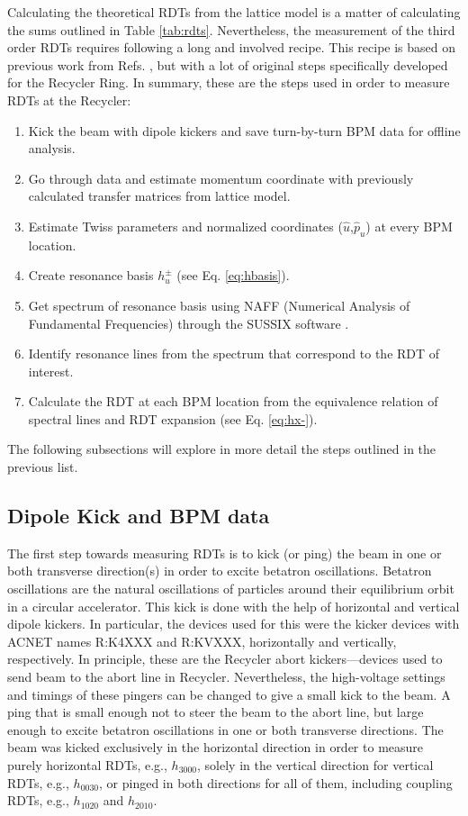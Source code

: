 Calculating the theoretical RDTs from the lattice model is a matter of calculating the sums outlined in Table \ref{tab:rdts}. Nevertheless, the measurement of the third order RDTs requires following a long and involved recipe. This recipe is based on previous work from Refs. \cite{cernthesis2,bartolini}, but with a lot of original steps specifically developed for the Recycler Ring. In summary, these are the steps used in order to measure RDTs at the Recycler:
\begin{enumerate}
    \item Kick the beam with dipole kickers and save turn-by-turn BPM data for offline analysis.
    \item Go through data and estimate momentum coordinate with previously calculated transfer matrices from lattice model.
    \item Estimate Twiss parameters and normalized coordinates ($\hat{u}$,$\hat{p}_u$) at every BPM location.
    \item Create resonance basis $h_u^{\pm}$ (see Eq. \ref{eq:hbasis}).
    \item Get spectrum of resonance basis using NAFF (Numerical Analysis of Fundamental Frequencies) through the SUSSIX software \cite{sussix}.
    \item Identify resonance lines from the spectrum that correspond to the RDT of interest.
    \item Calculate the RDT at each BPM location from the equivalence relation of spectral lines and RDT expansion (see Eq. \ref{eq:hx-}). 
\end{enumerate}
The following subsections will explore in more detail the steps outlined in the previous list.

\subsection{Dipole Kick and BPM data}

The first step towards measuring RDTs is to kick (or ping) the beam in one or both transverse direction(s) in order to excite betatron oscillations. Betatron oscillations are the natural oscillations of particles around their equilibrium orbit in a circular accelerator. This kick is done with the help of horizontal and vertical dipole kickers. In particular, the devices used for this were the kicker devices with ACNET names R:K4XXX and R:KVXXX, horizontally and vertically, respectively. In principle, these are the Recycler abort kickers---devices used to send beam to the abort line in Recycler. Nevertheless, the high-voltage settings and timings of these pingers can be changed to give a small kick to the beam. A ping that is small enough not to steer the beam to the abort line, but large enough to excite betatron oscillations in one or both transverse directions. The beam was kicked exclusively in the horizontal direction in order to measure purely horizontal RDTs, e.g., $h_{3000}$, solely in the vertical direction for vertical RDTs, e.g., $h_{0030}$, or pinged in both directions for all of them, including coupling RDTs, e.g., $h_{1020}$ and $h_{2010}$.

